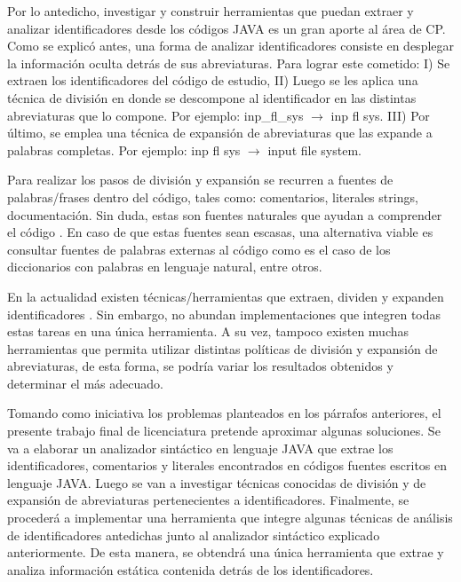 \documentclass[a4paper,12pt]{report}
\begin{document}
\hspace{0.5cm}Por lo antedicho, investigar y construir herramientas que puedan extraer y analizar identificadores desde los códigos JAVA es un gran aporte al área de CP. Como se explicó antes, una forma de analizar identificadores consiste en desplegar la información oculta detrás de sus abreviaturas. Para lograr este cometido: I) Se extraen los identificadores del código de estudio, II) Luego se les aplica una técnica de división en donde se descompone al identificador en las distintas abreviaturas que lo compone. Por ejemplo: \textsf{inp\_fl\_sys} $\rightarrow$ \textsf{inp fl sys}. III) Por último, se emplea una técnica de expansión de abreviaturas que las expande a palabras completas. Por ejemplo: \textsf{inp fl sys} $\rightarrow$ \textsf{input file system}.

\hspace{0.5cm}Para realizar los pasos de división y expansión se recurren a fuentes de palabras/frases dentro del código, tales como: comentarios, literales strings, documentación.
Sin duda, estas son fuentes naturales que ayudan a comprender el código \cite{JDPH08}.
En caso de que estas fuentes sean escasas, una alternativa viable es consultar fuentes de palabras externas al código como es el caso de los diccionarios con palabras en lenguaje natural, entre otros.

\hspace{0.5cm}En la actualidad existen técnicas/herramientas que extraen, dividen y expanden identificadores \cite{EZH08, EHPV09, BCPT00, HDD06}. Sin embargo, no abundan implementaciones que integren todas estas tareas en una única herramienta. A su vez, tampoco existen muchas herramientas que permita utilizar distintas políticas de división y expansión de abreviaturas, de esta forma, se podría variar los resultados obtenidos y determinar el más adecuado.

\hspace{0.5cm} Tomando como iniciativa los problemas planteados en los párrafos anteriores, el presente trabajo final de licenciatura pretende aproximar algunas soluciones. Se va a elaborar un analizador sintáctico en lenguaje JAVA que extrae los identificadores, comentarios y literales encontrados en códigos fuentes escritos en lenguaje JAVA.
Luego se van a investigar técnicas conocidas de división y de expansión de abreviaturas pertenecientes a identificadores. Finalmente, se procederá a implementar una herramienta que integre algunas técnicas de análisis de identificadores antedichas junto al analizador sintáctico explicado anteriormente. De esta manera, se obtendrá una única herramienta que extrae y analiza información estática contenida detrás de los identificadores. 
\end{document}
